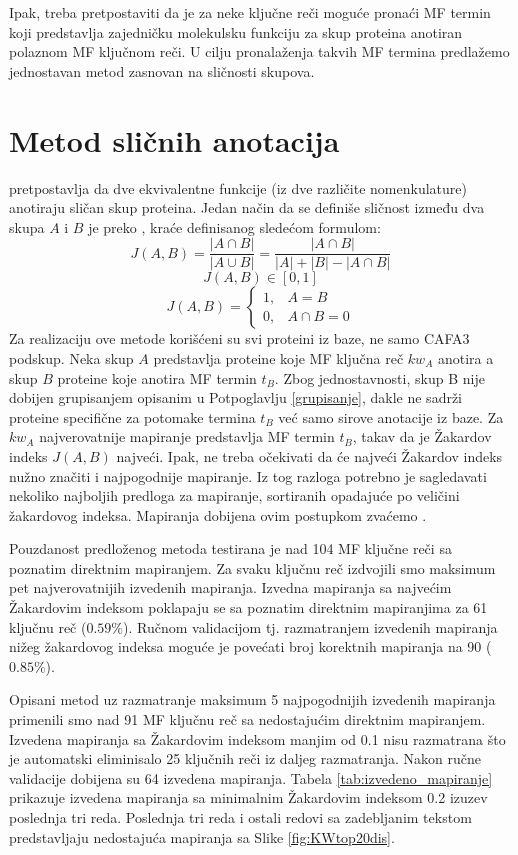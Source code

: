 Ipak, treba pretpostaviti da je za neke ključne reči moguće pronaći MF termin
koji predstavlja zajedničku molekulsku funkciju za skup proteina anotiran
polaznom MF ključnom reči.  U cilju pronalaženja takvih MF termina predlažemo
jednostavan metod zasnovan na sličnosti skupova.

\section{Metod sličnih anotacija}

 pretpostavlja da dve ekvivalentne funkcije (iz dve
različite nomenkulature) anotiraju sličan skup proteina.  Jedan način da se
definiše sličnost između dva skupa $A$ i $B$ je preko 
, kraće   definisanog sledećom formulom:
$$J(A,B) = \dfrac{|A \cap B|}{|A \cup B|} =  \dfrac{|A \cap B|}{|A|+|B|-|A \cap B|}$$
$$  J(A,B) \in [0, 1] $$
\[   
  J(A,B) = 
    \begin{cases}
      1,&A=B  \\
      0,&A\cap B=0
    \end{cases}
\]
Za realizaciju ove metode korišćeni su svi proteini iz \swissprot baze, ne samo
CAFA3 podskup.  Neka skup $A$ predstavlja proteine koje MF ključna reč $kw_A$
anotira a skup $B$ proteine koje anotira MF termin $t_B$.  Zbog jednostavnosti,
skup B nije dobijen grupisanjem opisanim u Potpoglavlju \ref{grupisanje}, dakle ne sadrži proteine specifične za potomake termina $t_B$ već samo
sirove anotacije iz \swissprot baze.  Za $kw_A$ najverovatnije
mapiranje predstavlja MF termin $t_B$, takav da je Žakardov indeks $J(A,B)$
najveći. Ipak, ne treba očekivati da će najveći Žakardov indeks nužno značiti i
najpogodnije mapiranje. Iz tog razloga potrebno je  sagledavati nekoliko
najboljih predloga za mapiranje, sortiranih opadajuće po veličini žakardovog
indeksa. Mapiranja dobijena ovim postupkom zvaćemo .

Pouzdanost predloženog metoda testirana je nad 104 MF ključne reči sa poznatim
direktnim mapiranjem.  Za svaku ključnu reč izdvojili smo maksimum pet
najverovatnijih izvedenih mapiranja. Izvedna mapiranja sa najvećim Žakardovim
indeksom poklapaju se sa poznatim direktnim mapiranjima za 61 ključnu reč
($0.59\%$). Ručnom validacijom tj. razmatranjem izvedenih mapiranja nižeg
žakardovog indeksa moguće je povećati broj korektnih mapiranja na 90
($0.85\%$).

Opisani metod uz razmatranje maksimum 5 najpogodnijih izvedenih mapiranja
primenili smo nad 91 MF ključnu reč sa nedostajućim direktnim mapiranjem.
Izvedena mapiranja sa Žakardovim indeksom manjim od 0.1 nisu razmatrana što je
automatski eliminisalo 25 ključnih reči iz daljeg razmatranja. Nakon ručne
validacije dobijena su 64 izvedena mapiranja.  Tabela
\ref{tab:izvedeno_mapiranje} prikazuje izvedena mapiranja sa minimalnim
Žakardovim indeksom 0.2 izuzev poslednja tri reda. Poslednja tri reda i
ostali redovi sa zadebljanim tekstom  predstavljaju nedostajuća
mapiranja sa Slike \ref{fig:KWtop20dis}.


